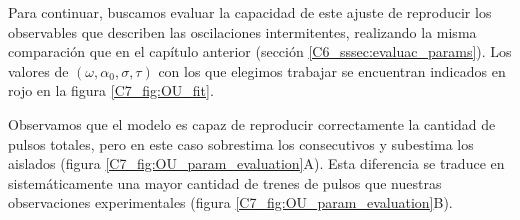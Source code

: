 \documentclass[./main.tex]{subfiles}
\begin{document}
Para continuar, buscamos evaluar la capacidad de este ajuste de reproducir los observables que describen las oscilaciones intermitentes, realizando la misma comparación que en el capítulo anterior (sección \ref{C6_sssec:evaluac_params}). Los valores de $(\omega,\alpha_0,\sigma,\tau)$ con los que elegimos trabajar se encuentran indicados en rojo en la figura \ref{C7_fig:OU_fit}. 

Observamos que el modelo es capaz de reproducir correctamente la cantidad de pulsos totales, pero en este caso sobrestima los consecutivos y subestima los aislados (figura \ref{C7_fig:OU_param_evaluation}A). Esta diferencia se traduce en sistemáticamente una mayor cantidad de trenes de pulsos que nuestras observaciones experimentales (figura \ref{C7_fig:OU_param_evaluation}B).
\end{document}
